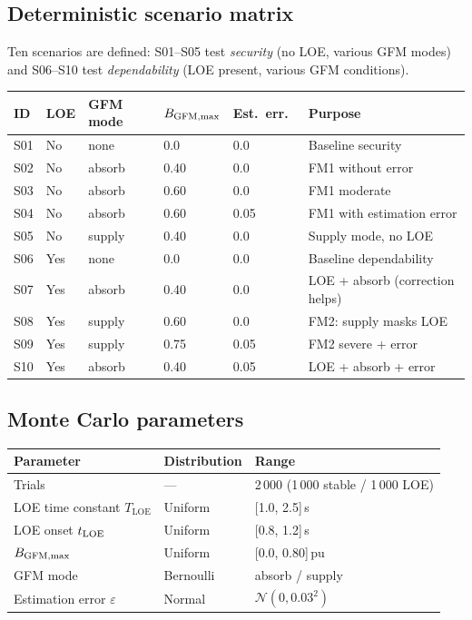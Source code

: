 \documentclass[11pt,a4paper]{article}
\newcommand{\Tloe}{T_{\mathrm{LOE}}}
\begin{document}
\subsection{Deterministic scenario matrix}

Ten scenarios are defined: S01--S05 test \emph{security} (no LOE, various GFM
modes) and S06--S10 test \emph{dependability} (LOE present, various GFM
conditions).

\begin{center}
\begin{tabular}{llllll}
  \toprule
  ID & LOE & GFM mode & $B_{\rm GFM,max}$ & Est.\ err.\ & Purpose \\
  \midrule
  S01 & No  & none     & 0.0  & 0.0  & Baseline security \\
  S02 & No  & absorb   & 0.40 & 0.0  & FM1 without error \\
  S03 & No  & absorb   & 0.60 & 0.0  & FM1 moderate \\
  S04 & No  & absorb   & 0.60 & 0.05 & FM1 with estimation error \\
  S05 & No  & supply   & 0.40 & 0.0  & Supply mode, no LOE \\
  S06 & Yes & none     & 0.0  & 0.0  & Baseline dependability \\
  S07 & Yes & absorb   & 0.40 & 0.0  & LOE + absorb (correction helps) \\
  S08 & Yes & supply   & 0.60 & 0.0  & FM2: supply masks LOE \\
  S09 & Yes & supply   & 0.75 & 0.05 & FM2 severe + error \\
  S10 & Yes & absorb   & 0.40 & 0.05 & LOE + absorb + error \\
  \bottomrule
\end{tabular}
\end{center}

\subsection{Monte Carlo parameters}
\label{sec:mc_params}

\begin{center}
\begin{tabular}{lll}
  \toprule
  Parameter & Distribution & Range \\
  \midrule
  Trials & — & 2\,000 (1\,000 stable / 1\,000 LOE) \\
  LOE time constant $\Tloe$ & Uniform & [1.0, 2.5]\,s \\
  LOE onset $t_{\rm LOE}$  & Uniform & [0.8, 1.2]\,s \\
  $B_{\rm GFM,max}$        & Uniform & [0.0, 0.80]\,pu \\
  GFM mode                 & Bernoulli & absorb / supply \\
  Estimation error $\varepsilon$ & Normal & $\mathcal{N}(0, 0.03^2)$ \\
  \bottomrule
\end{tabular}
\end{center}
\end{document}

